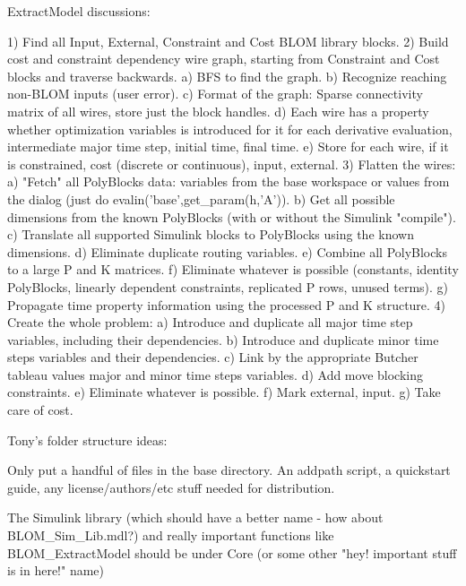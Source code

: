 

ExtractModel discussions:


1) Find all Input, External, Constraint and Cost BLOM library blocks.
2) Build cost and constraint dependency wire graph, starting from Constraint and Cost blocks and traverse backwards.
    a)  BFS to find the graph.
    b)  Recognize reaching non-BLOM inputs (user error).
    c)  Format of the graph: Sparse connectivity matrix of all wires, 
        store just the block handles.
    d)  Each wire has a property whether optimization variables is
            introduced for it for each derivative evaluation, 
        intermediate major time step, initial time, final time.
    e)  Store for each wire, if it is constrained, cost (discrete or continuous), 
        input, external.
3) Flatten the wires:
    a)  "Fetch" all PolyBlocks data: variables from the base workspace 
        or values from the dialog (just do evalin('base',get_param(h,'A')).
    b)  Get all possible dimensions from the known PolyBlocks (with or without the Simulink "compile").
    c)  Translate all supported Simulink blocks to PolyBlocks using the known dimensions.   
    d)  Eliminate duplicate routing variables. 
    e)  Combine all PolyBlocks to a large P and K matrices.
    f)  Eliminate whatever is possible (constants, identity PolyBlocks, linearly dependent constraints, replicated P rows, unused terms).
    g)  Propagate time property information using the processed P and K structure.    
4) Create the whole problem:
    a)  Introduce and duplicate all major time step variables, including their dependencies.
    b)  Introduce and duplicate minor time steps variables and their dependencies.
    c)  Link by the appropriate Butcher tableau values major and minor time steps variables.
    d)  Add move blocking constraints.
    e)  Eliminate whatever is possible.
    f)  Mark external, input.
    g)  Take care of cost.




Tony's folder structure ideas:

Only put a handful of files in the base directory. An addpath script, a quickstart guide, any license/authors/etc stuff needed for distribution.

The Simulink library (which should have a better name - how about BLOM_Sim_Lib.mdl?) and really important functions like BLOM_ExtractModel should be under Core (or some other "hey! important stuff is in here!" name)


